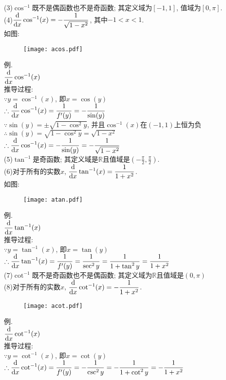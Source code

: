 (3)$\cos^{-1}$既不是偶函数也不是奇函数; 其定义域为$[-1,1]$, 值域为$[0,\pi]$.\\[1ex]
(4)$\displaystyle\frac{\mathop{}\!\mathrm{d} }{\mathop{}\!\mathrm{d} x}\cos^{-1}(x)=-\frac{1}{\sqrt{1-x^2}}$, 其中$-1<x<1$.\\[1ex]
如图:
\begin{figure}[H]
\centering
	\texttt{[image: acos.pdf]}
\end{figure}
例.\\
\phantom{例}$\displaystyle\frac{\mathop{}\!\mathrm{d}}{\mathop{}\!\mathrm{d} x}\cos^{-1}(x)$\\
推导过程:\\
$\displaystyle\because y=\cos^{-1}(x)$, 即$x=\cos(y)$\\
$\displaystyle\therefore\frac{\mathop{}\!\mathrm{d}}{\mathop{}\!\mathrm{d} x}\cos^{-1}(x)=\frac{1}{f'(y)}=-\frac{1}{\sin(y)}$\\
$\displaystyle\because\sin(y)=\pm\sqrt{1-\cos^2y}$, 并且$\cos^{-1}(x)$在$(-1,1)$上恒为负\\
$\displaystyle\therefore\sin(y)=\sqrt{1-\cos^2y}=\sqrt{1-x^2}$\\
$\displaystyle\therefore\frac{\mathop{}\!\mathrm{d}}{\mathop{}\!\mathrm{d} x}\cos^{-1}(x)=-\frac{1}{\sin(y)}=-\frac{1}{\sqrt{1-x^2}}$\\[1ex]

(5)$\tan^{-1}$是奇函数; 其定义域是$\mathbb{R}$且值域是$\displaystyle(-\frac{\pi}{2},\frac{\pi}{2})$.\\[1ex]
(6)对于所有的实数$x$, $\displaystyle\frac{\mathop{}\!\mathrm{d} }{\mathop{}\!\mathrm{d} x}\tan^{-1}(x)=\frac{1}{1+x^2}$.\\[1ex]
如图:
\begin{figure}[H]
\centering
	\texttt{[image: atan.pdf]}
\end{figure}
例.\\
\phantom{例}$\displaystyle\frac{\mathop{}\!\mathrm{d}}{\mathop{}\!\mathrm{d} x}\tan^{-1}(x)$\\
推导过程:\\
$\displaystyle\because y=\tan^{-1}(x)$, 即$x=\tan(y)$\\
$\displaystyle\therefore\frac{\mathop{}\!\mathrm{d}}{\mathop{}\!\mathrm{d} x}\tan^{-1}(x)=\frac{1}{f'(y)}=\frac{1}{\sec^2y}=\frac{1}{1+\tan^2y}=\frac{1}{1+x^2}$\\[1ex]

(7)$\cot^{-1}$既不是奇函数也不是偶函数; 其定义域为$\mathbb{R}$且值域是$(0,\pi)$\\[1ex]
(8)对于所有的实数$x$, $\displaystyle\frac{\mathop{}\!\mathrm{d} }{\mathop{}\!\mathrm{d} x}\cot^{-1}(x)=-\frac{1}{1+x^2}$.\\[1ex]
\begin{figure}[H]
\centering
	\texttt{[image: acot.pdf]}
\end{figure}
例.\\
\phantom{例}$\displaystyle\frac{\mathop{}\!\mathrm{d}}{\mathop{}\!\mathrm{d} x}\cot^{-1}(x)$\\
推导过程:\\
$\displaystyle\because y=\cot^{-1}(x)$, 即$x=\cot(y)$\\
$\displaystyle\therefore\frac{\mathop{}\!\mathrm{d}}{\mathop{}\!\mathrm{d} x}\cot^{-1}(x)=\frac{1}{f'(y)}=-\frac{1}{\csc^2y}=-\frac{1}{1+\cot^2y}=-\frac{1}{1+x^2}$\\[1ex]

